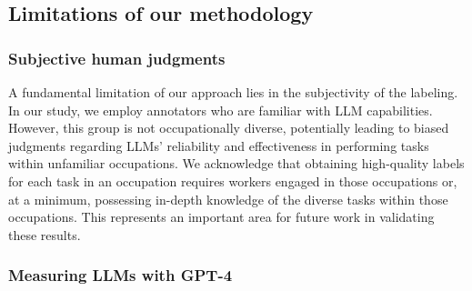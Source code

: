 \documentclass[11pt]{article}
\begin{document}
\subsection{Limitations of our methodology}
\subsubsection{Subjective human judgments}
A fundamental limitation of our approach lies in the subjectivity of the labeling. In our study, we employ annotators who are familiar with LLM capabilities. However, this group is not occupationally diverse, potentially leading to biased judgments regarding LLMs' reliability and effectiveness in performing tasks within unfamiliar occupations. We acknowledge that obtaining high-quality labels for each task in an occupation requires workers engaged in those occupations or, at a minimum, possessing in-depth knowledge of the diverse tasks within those occupations. This represents an important area for future work in validating these results.


\subsubsection{Measuring LLMs with GPT-4}
\end{document}
